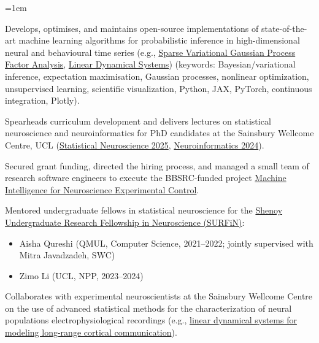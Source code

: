 \documentclass{article}
\begin{document}
\begin{list}{}{\leftmargin=1em}

\item Develops, optimises, and maintains open-source implementations of
    state-of-the-art machine learning algorithms for probabilistic inference in
    high-dimensional neural and behavioural time series (e.g.,
    \href{https://github.com/joacorapela/svGPFA}{Sparse Variational Gaussian
    Process Factor Analysis}, \href{https://github.com/joacorapela/ssm}{Linear
    Dynamical Systems})
    (keywords: Bayesian/variational inference, expectation maximisation,
    Gaussian processes, nonlinear optimization, unsupervised learning,
    scientific visualization, Python, JAX, PyTorch, continuous integration,
    Plotly).

\item Spearheads curriculum development and delivers lectures on statistical
    neuroscience and neuroinformatics for PhD candidates at the Sainsbury
    Wellcome Centre, UCL
    (\href{https://github.com/joacorapela/statNeuro2025}{Statistical
    Neuroscience 2025},
    \href{https://github.com/joacorapela/neuroinformatics24}{Neuroinformatics
    2024}).

\item Secured grant funding, directed the hiring process, and managed a small
    team of research software engineers to execute the BBSRC-funded project
    \href{https://gtr.ukri.org/projects?ref=BB\%2FW019132\%2F1}{Machine
    Intelligence for Neuroscience Experimental Control}.

\item Mentored undergraduate fellows in statistical neuroscience for the
    \href{https://www.simonsfoundation.org/grant/shenoy-undergraduate-research-fellowship-in-neuroscience-surfin/}{Shenoy
    Undergraduate Research Fellowship in Neuroscience (SURFiN)}:

  \begin{itemize}
    \item Aisha Qureshi (QMUL, Computer Science, 2021--2022; jointly supervised with Mitra Javadzadeh, SWC)
    \item Zimo Li (UCL, NPP, 2023--2024)
  \end{itemize}

\item Collaborates with experimental neuroscientists at the Sainsbury Wellcome
    Centre on the use of advanced statistical methods for the
    characterization of neural populations electrophysiological recordings
    (e.g.,
    \href{https://github.com/joacorapela/ldsForNeuralPopulation}{linear
    dynamical systems for modeling long-range cortical communication}).


\end{list}
\end{document}
